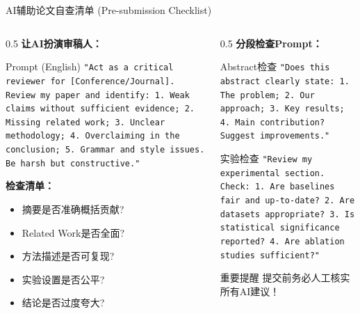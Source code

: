 \documentclass[aspectratio=169,11pt]{beamer}
\begin{document}
\begin{frame}{AI辅助论文自查清单 (Pre-submission Checklist)}
    \begin{columns}
        \begin{column}{0.5\textwidth}
            \textbf{让AI扮演审稿人：}
            \begin{exampleblock}{Prompt (English)}
                \small
                \texttt{"Act as a critical reviewer for [Conference/Journal]. Review my paper and identify: 1. Weak claims without sufficient evidence; 2. Missing related work; 3. Unclear methodology; 4. Overclaiming in the conclusion; 5. Grammar and style issues. Be harsh but constructive."}
            \end{exampleblock}
            
            \vspace{0.3cm}
            \textbf{检查清单：}
            \begin{itemize}
                \item[$\square$] 摘要是否准确概括贡献?
                \item[$\square$] Related Work是否全面?
                \item[$\square$] 方法描述是否可复现?
                \item[$\square$] 实验设置是否公平?
                \item[$\square$] 结论是否过度夸大?
            \end{itemize}
        \end{column}
        \begin{column}{0.5\textwidth}
            \textbf{分段检查Prompt：}
            \begin{exampleblock}{Abstract检查}
                \small
                \texttt{"Does this abstract clearly state: 1. The problem; 2. Our approach; 3. Key results; 4. Main contribution? Suggest improvements."}
            \end{exampleblock}
            
            \begin{exampleblock}{实验检查}
                \small
                \texttt{"Review my experimental section. Check: 1. Are baselines fair and up-to-date? 2. Are datasets appropriate? 3. Is statistical significance reported? 4. Are ablation studies sufficient?"}
            \end{exampleblock}
            
            \begin{alertblock}{重要提醒}
                提交前务必人工核实所有AI建议！
            \end{alertblock}
        \end{column}
    \end{columns}
\end{frame}
\end{document}
